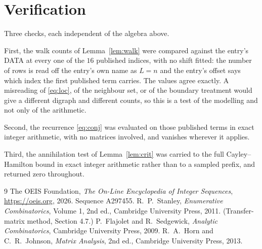 \documentclass[11pt,a4paper]{article}
\theoremstyle{plain}
\theoremstyle{definition}
\begin{document}
\section{Verification}

Three checks, each independent of the algebra above.

First, the walk counts of Lemma~\ref{lem:walk} were compared against the entry's DATA at
every one of the $16$ published indices, with no shift fitted: the number of rows is
read off the entry's own name as $L=n$ and the entry's offset says which index the first
published term carries. The values agree exactly. A misreading of \eqref{eq:loc}, of the
neighbour set, or of the boundary treatment would give a different digraph and different
counts, so this is a test of the modelling and not only of the arithmetic.

Second, the recurrence \eqref{eq:conj} was evaluated on those published terms in exact
integer arithmetic, with no matrices involved, and vanishes wherever it applies.

Third, the annihilation test of Lemma~\ref{lem:crit} was carried to the full
Cayley--Hamilton bound in exact integer arithmetic rather than to a sampled prefix, and
returned zero throughout.

\begin{thebibliography}{9}
 The OEIS Foundation, \emph{The On-Line Encyclopedia of Integer
Sequences}, \url{https://oeis.org}, 2026. Sequence A297455.
 R.~P.~Stanley, \emph{Enumerative Combinatorics}, Volume 1, 2nd ed.,
Cambridge University Press, 2011. (Transfer-matrix method, Section 4.7.)
 P.~Flajolet and R.~Sedgewick, \emph{Analytic Combinatorics}, Cambridge
University Press, 2009.
 R.~A.~Horn and C.~R.~Johnson, \emph{Matrix Analysis}, 2nd ed., Cambridge
University Press, 2013.
\end{thebibliography}
\end{document}
